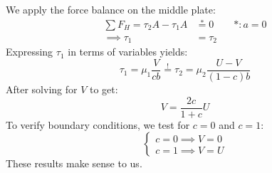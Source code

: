 We apply the force balance on the middle plate:
\begin{equation*}
    \begin{split}
    \sum F_H = \tau_2A-\tau_1A &\stackrel{*}{=} 0\qquad *: a= 0\\
    \implies \tau_1 &= \tau_2
    \end{split}
\end{equation*}
Expressing $\tau_1$ in terms of variables yields:
$$
\tau_1 = \mu_1\frac V{cb}\stackrel{!}{=}\tau_2=\mu_2\frac{U-V}{(1-c)b}
$$
After solving for $V$ to get:
$$
V=\frac {2c}{1+c}U
$$
To verify boundary conditions, we test for $c=0$ and $c=1$:
$$
\begin{cases}
c=0\implies V=0\\
c=1 \implies V = U
\end{cases}
$$
These results make sense to us.